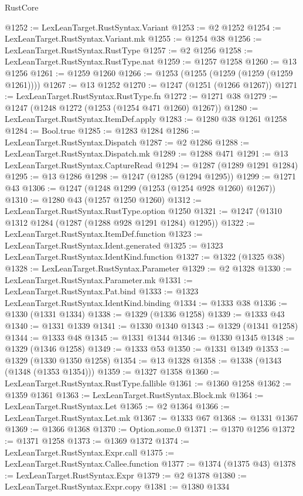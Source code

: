 \begin{lexlean}{RustCore}
\begin{coremodule}
@1252 := LexLeanTarget.RustSyntax.Variant
@1253 := @2 @1252
@1254 := LexLeanTarget.RustSyntax.Variant.mk
@1255 := @1254 @38
@1256 := LexLeanTarget.RustSyntax.RustType
@1257 := @2 @1256
@1258 := LexLeanTarget.RustSyntax.RustType.nat
@1259 := @1257 @1258
@1260 := @13 @1256
@1261 := @1259 @1260
@1266 := @1253 (@1255 (@1259 (@1259 (@1259 @1261))))
@1267 := @13 @1252
@1270 := @1247 (@1251 (@1266 @1267))
@1271 := LexLeanTarget.RustSyntax.RustType.fn
@1272 := @1271 @38
@1279 := @1247 (@1248 @1272 (@1253 (@1254 @471 @1260) @1267))
@1280 := LexLeanTarget.RustSyntax.ItemDef.apply
@1283 := @1280 @38 @1261 @1258
@1284 := Bool.true
@1285 := @1283 @1284
@1286 := LexLeanTarget.RustSyntax.Dispatch
@1287 := @2 @1286
@1288 := LexLeanTarget.RustSyntax.Dispatch.mk
@1289 := @1288 @471
@1291 := @13 LexLeanTarget.RustSyntax.CaptureRead
@1294 := @1287 (@1289 @1291 @1284)
@1295 := @13 @1286
@1298 := @1247 (@1285 (@1294 @1295))
@1299 := @1271 @43
@1306 := @1247 (@1248 @1299 (@1253 (@1254 @928 @1260) @1267))
@1310 := @1280 @43 (@1257 @1250 @1260)
@1312 := LexLeanTarget.RustSyntax.RustType.option @1250
@1321 := @1247 (@1310 @1312 @1284 (@1287 (@1288 @928 @1291 @1284) @1295))
@1322 := LexLeanTarget.RustSyntax.ItemDef.function
@1323 := LexLeanTarget.RustSyntax.Ident.generated
@1325 := @1323 LexLeanTarget.RustSyntax.IdentKind.function
@1327 := @1322 (@1325 @38)
@1328 := LexLeanTarget.RustSyntax.Parameter
@1329 := @2 @1328
@1330 := LexLeanTarget.RustSyntax.Parameter.mk
@1331 := LexLeanTarget.RustSyntax.Pat.bind
@1333 := @1323 LexLeanTarget.RustSyntax.IdentKind.binding
@1334 := @1333 @38
@1336 := @1330 (@1331 @1334)
@1338 := @1329 (@1336 @1258)
@1339 := @1333 @43
@1340 := @1331 @1339
@1341 := @1330 @1340
@1343 := @1329 (@1341 @1258)
@1344 := @1333 @48
@1345 := @1331 @1344
@1346 := @1330 @1345
@1348 := @1329 (@1346 @1258)
@1349 := @1333 @53
@1350 := @1331 @1349
@1353 := @1329 (@1330 @1350 @1258)
@1354 := @13 @1328
@1358 := @1338 (@1343 (@1348 (@1353 @1354)))
@1359 := @1327 @1358
@1360 := LexLeanTarget.RustSyntax.RustType.fallible
@1361 := @1360 @1258
@1362 := @1359 @1361
@1363 := LexLeanTarget.RustSyntax.Block.mk
@1364 := LexLeanTarget.RustSyntax.Let
@1365 := @2 @1364
@1366 := LexLeanTarget.RustSyntax.Let.mk
@1367 := @1333 @67
@1368 := @1331 @1367
@1369 := @1366 @1368
@1370 := Option.some.{0}
@1371 := @1370 @1256
@1372 := @1371 @1258
@1373 := @1369 @1372
@1374 := LexLeanTarget.RustSyntax.Expr.call
@1375 := LexLeanTarget.RustSyntax.Callee.function
@1377 := @1374 (@1375 @43)
@1378 := LexLeanTarget.RustSyntax.Expr
@1379 := @2 @1378
@1380 := LexLeanTarget.RustSyntax.Expr.copy
@1381 := @1380 @1334

\end{coremodule}
\end{lexlean}
